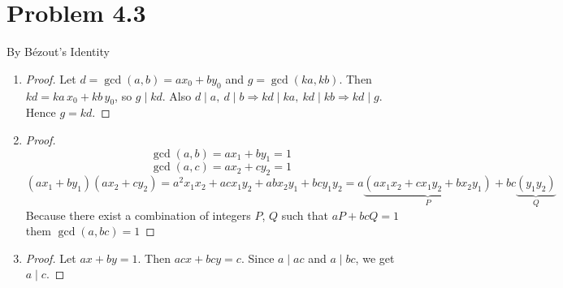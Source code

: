 \documentclass[12pt]{article}
\begin{document}
\newpage


\section*{Problem 4.3}
By Bézout's Identity 
\begin{enumerate}[label=\alph*)]
    \item   
    \begin{proof}
Let $d=\gcd(a,b)=ax_0+by_0$ and $g=\gcd(ka,kb)$. Then $kd=ka\,x_0+kb\,y_0$, so $g\mid kd$.
Also $d\mid a,\ d\mid b \Rightarrow kd\mid ka,\ kd\mid kb \Rightarrow kd\mid g$.
Hence $g=kd$.
\end{proof}
\item
\begin{proof}
    \[\gcd(a, b) = ax_1+by_1 = 1\]
    \[\gcd(a, c) = ax_2+cy_2 = 1\]
    \[(ax_1+by_1)(ax_2+cy_2) = a^2x_1x_2+acx_1y_2+abx_2y_1+bcy_1y_2=a\underbrace{(ax_1x_2+cx_1y_2+bx_2y_1)}_{P} +bc\underbrace{(y_1y_2)}_{Q}\]
    Because there exist a combination of integers $P$, $Q$ such that $aP+bcQ=1$ them $\gcd(a, bc)=1$
    \end{proof}
    \item\begin{proof}
Let $ax+by=1$. Then $acx+bcy=c$. Since $a\mid ac$ and $a\mid bc$, we get $a\mid c$.
\end{proof}

\end{enumerate}
\end{document}
